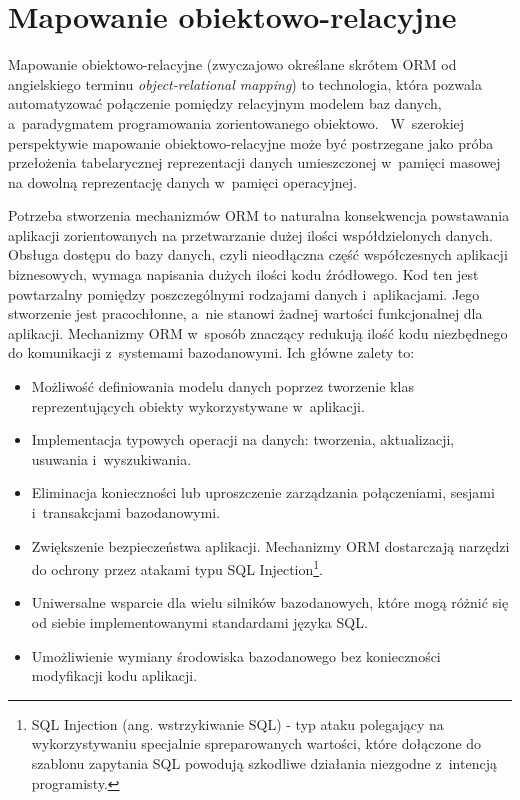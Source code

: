 
\chapter{Mapowanie obiektowo-relacyjne}

Mapowanie obiektowo-relacyjne (zwyczajowo określane skrótem ORM od angielskiego terminu \emph{object-relational mapping}) to technologia, która pozwala automatyzować połączenie pomiędzy relacyjnym modelem baz danych, a~paradygmatem programowania zorientowanego obiektowo.~\cite{orm_definition} W~szerokiej perspektywie mapowanie obiektowo-relacyjne może być postrzegane jako próba przełożenia tabelarycznej reprezentacji danych umieszczonej w~pamięci masowej na dowolną reprezentację danych w~pamięci operacyjnej.~\cite{fowler_orm_hate} 

Potrzeba stworzenia mechanizmów ORM to naturalna konsekwencja powstawania aplikacji zorientowanych na przetwarzanie dużej ilości współdzielonych danych. Obsługa dostępu do bazy danych, czyli nieodłączna część współczesnych aplikacji biznesowych, wymaga napisania dużych ilości kodu źródłowego. Kod ten jest powtarzalny pomiędzy poszczególnymi rodzajami danych i~aplikacjami. Jego stworzenie jest pracochłonne, a~nie stanowi żadnej wartości funkcjonalnej dla aplikacji. Mechanizmy ORM w~sposób znaczący redukują ilość kodu niezbędnego do komunikacji z~systemami bazodanowymi. Ich główne zalety to:

\begin{itemize}
	\item Możliwość definiowania modelu danych poprzez tworzenie klas reprezentujących obiekty wykorzystywane w~aplikacji.
	\item Implementacja typowych operacji na danych: tworzenia, aktualizacji, usuwania i~wyszukiwania.
	\item Eliminacja konieczności lub uproszczenie zarządzania połączeniami, sesjami i~transakcjami bazodanowymi.
	\item Zwiększenie bezpieczeństwa aplikacji. Mechanizmy ORM dostarczają narzędzi do ochrony przez atakami typu SQL Injection\footnote{SQL Injection (ang. wstrzykiwanie SQL) - typ ataku polegający na wykorzystywaniu specjalnie spreparowanych wartości, które dołączone do szablonu zapytania SQL powodują szkodliwe działania niezgodne z~intencją programisty.}.~\cite{orm_sql_injection_protection}
	\item Uniwersalne wsparcie dla wielu silników bazodanowych, które mogą różnić się od siebie implementowanymi standardami języka SQL. 
	\item Umożliwienie wymiany środowiska bazodanowego bez konieczności modyfikacji kodu aplikacji.
\end{itemize}

